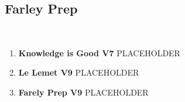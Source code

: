 \subsection*{Farley Prep}\label{bf:Farley Prep}
\

\begin{enumerate}[resume]
	\item\label{rt:Knowledge is Good} \colorbox{Goldenrod!50}{\textbf{Knowledge is Good V7  } }
	\newline PLACEHOLDER\
	\item\label{rt:Le Lemet} \colorbox{Goldenrod!50}{\textbf{Le Lemet V9  } }
	\newline PLACEHOLDER\
	\item\label{rt:Farely Prep} \colorbox{Goldenrod!50}{\textbf{Farely Prep V9  } }
	\newline PLACEHOLDER\
\end{enumerate}
\clearpage